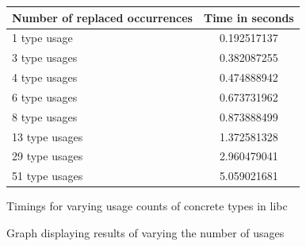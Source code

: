 \begin{figure}[H]
\begin{center}
    \begin{tabular}{ | l | c |}
    \hline
    \textbf{Number of replaced occurrences} & \textbf{Time in seconds} \\ \hline
    1 type usage &  0.192517137  \\ \hline
    3 type usages &  0.382087255  \\ \hline
    4 type usages &   0.474888942  \\ \hline
    6 type usages &   0.673731962  \\ \hline
    8 type usages &   0.873888499 \\ \hline
    13 type usages  &  1.372581328 \\ \hline
    29 type usages &  2.960479041  \\ \hline
    51 type usages &  5.059021681 \\ \hline
    \end{tabular}
\end{center}

\caption{Timings for varying usage counts of concrete types in libc}
\label{Fig:scaling}
\end{figure}

\begin{figure}[H]
\begin{center}
\caption{Graph displaying results of varying the number of usages}
\label{Fig:comparerefs}
\end{center}
\end{figure}